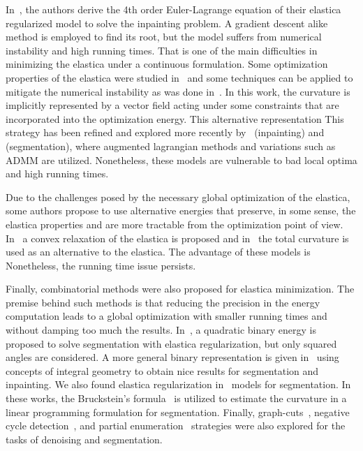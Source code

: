 \documentclass[smallextended]{svjour3}
\begin{document}
In~\cite{chan02elasticainpainting}, the authors derive the 4th order
Euler-Lagrange equation of their elastica regularized model to solve
the inpainting problem. A gradient descent alike method is employed to
find its root, but the model suffers from numerical instability and
high running times. That is one of the main difficulties in minimizing
the elastica under a continuous formulation. Some optimization
properties of the elastica were studied in~\cite{ambrosio2003direct}
and some techniques can be applied to mitigate the numerical
instability as was done in~\cite{ballester01filljoint}. In this work,
the curvature is implicitly represented by a vector field acting under
some constraints that are incorporated into the optimization
energy. This alternative representation  This strategy has been refined
and explored more recently by~\cite{tai11elastica} (inpainting)
and~\cite{zhu2013image,duan2014two} (segmentation), where augmented
lagrangian methods and variations such as ADMM are
utilized. Nonetheless, these models are vulnerable to bad local optima
and  high running times.


Due to the challenges posed by the necessary global optimization of
the elastica, some authors propose to use alternative energies that
preserve, in some sense, the elastica properties and are more
tractable from the optimization point of
view. In~\cite{bredies15convex} a convex relaxation of the elastica is
proposed and in~\cite{goldluecke11totalcurvature,zhong2020minimizing}
the total curvature is used as an alternative to the elastica. The
advantage of these models is  Nonetheless, the running time
issue persists.


Finally, combinatorial methods were also proposed for elastica minimization. The
premise behind such methods is that reducing the precision in the energy
computation leads to a global optimization with smaller running times and
without damping too much the results. In~\cite{zehiry10fast}, a quadratic binary
energy is proposed to solve segmentation with elastica regularization, but only 
squared angles are considered. A more general binary representation is given 
in~\cite{nieuwenhuis14efficient} using concepts of integral geometry to obtain
nice results for segmentation and inpainting. We also found elastica 
regularization in~\cite{schoenemann09linear,strandmark11globalframework} models 
for segmentation. In these works, the Bruckstein's 
formula~\cite{bruckstein01convergence} is utilized to estimate the curvature 
in a linear programming formulation for segmentation. Finally, 
graph-cuts~\cite{bae2010graph}, negative cycle 
detection~\cite{schoenemann2011elastic}, and partial 
enumeration~\cite{olsson2013partial,antunes20} strategies were also explored 
for the tasks of denoising and segmentation.
\end{document}
